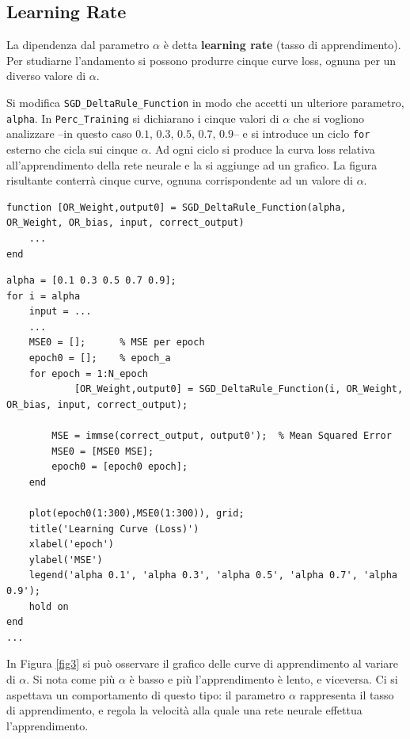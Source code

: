 \documentclass[a4paper,11pt]{article}
\begin{document}
\subsection{Learning Rate}

La dipendenza dal parametro $\alpha$ è detta \textbf{learning rate} (tasso di apprendimento). Per studiarne l'andamento si possono produrre cinque curve loss, ognuna per un diverso valore di $\alpha$.

Si modifica \texttt{SGD\_DeltaRule\_Function} in modo che accetti un ulteriore parametro, \texttt{alpha}. In \texttt{Perc\_Training} si dichiarano i cinque valori di $\alpha$ che si vogliono analizzare --in questo caso $0.1$, $0.3$, $0.5$, $0.7$, $0.9$-- e si introduce un ciclo \texttt{for} esterno che cicla sui cinque $\alpha$. Ad ogni ciclo si produce la curva loss relativa all'apprendimento della rete neurale e la si aggiunge ad un grafico. La figura risultante conterrà cinque curve, ognuna corrispondente ad un valore di $\alpha$.

\begin{lstlisting}[style=Matlab-editor,title=\texttt{SGD\_DeltaRule\_Function.mat}]
function [OR_Weight,output0] = SGD_DeltaRule_Function(alpha, OR_Weight, OR_bias, input, correct_output)
    ...
end	
\end{lstlisting}

\begin{lstlisting}[style=Matlab-editor,title=\texttt{Perc\_Training.mat}]
alpha = [0.1 0.3 0.5 0.7 0.9];
for i = alpha
    input = ... 
    ...
    MSE0 = [];      % MSE per epoch
    epoch0 = [];    % epoch_a
    for epoch = 1:N_epoch
            [OR_Weight,output0] = SGD_DeltaRule_Function(i, OR_Weight, OR_bias, input, correct_output);

        MSE = immse(correct_output, output0');  % Mean Squared Error
        MSE0 = [MSE0 MSE];
        epoch0 = [epoch0 epoch];
    end

    plot(epoch0(1:300),MSE0(1:300)), grid;
    title('Learning Curve (Loss)')
    xlabel('epoch')
    ylabel('MSE')
    legend('alpha 0.1', 'alpha 0.3', 'alpha 0.5', 'alpha 0.7', 'alpha 0.9');
    hold on
end
...
\end{lstlisting}

In Figura \vref{fig3} si può osservare il grafico delle curve di apprendimento al variare di $\alpha$. Si nota come più $\alpha$ è basso e più l'apprendimento è lento, e viceversa. Ci si aspettava un comportamento di questo tipo: il parametro $\alpha$ rappresenta il tasso di apprendimento, e regola la velocità alla quale una rete neurale effettua l'apprendimento.
\end{document}
